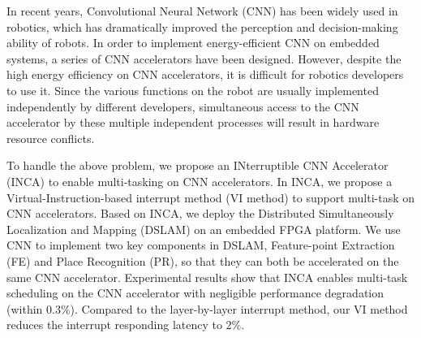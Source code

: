 In recent years, Convolutional Neural Network (CNN) has been widely used in robotics, which has dramatically improved the perception and decision-making ability of robots.
In order to implement energy-efficient CNN on embedded systems, a series of CNN accelerators have been designed. However, despite the high energy efficiency on CNN accelerators, it is difficult for robotics developers to use it. Since the various functions on the robot are usually implemented independently by different developers, simultaneous access to the CNN accelerator by these multiple independent processes will result in hardware resource conflicts.

To handle the above problem, we propose an INterruptible CNN Accelerator (INCA) to enable multi-tasking on CNN accelerators. In INCA, we propose a Virtual-Instruction-based interrupt method (VI method) to support multi-task on CNN accelerators. Based on INCA, we deploy the Distributed Simultaneously Localization and Mapping (DSLAM) on an embedded FPGA platform. We use CNN to implement two key components in DSLAM, Feature-point Extraction (FE) and Place Recognition (PR), so that they can both be accelerated on the same CNN accelerator. Experimental results show that INCA enables multi-task scheduling on the CNN accelerator with negligible performance degradation (within 0.3\%). Compared to the layer-by-layer interrupt method, our VI method reduces the interrupt responding latency to 2\%.